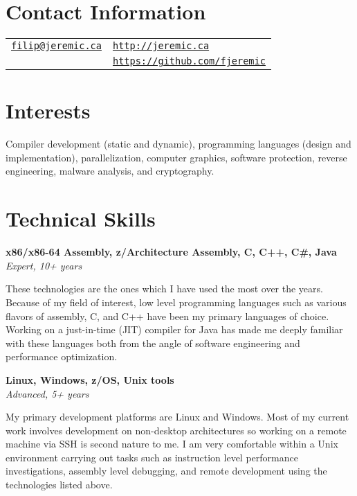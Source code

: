 \documentclass[margin,line]{res}
\begin{document}

\begin{resume}
\section{\sc Contact Information}

\vspace{.05in}

\begin{tabular}{@{}p{3.36in}p{3in}}
\href{mailto:filip@jeremic.ca}{\texttt{filip@jeremic.ca}} & \href{http://jeremic.ca}{\texttt{http://jeremic.ca}} \\
& \href{https://github.com/fjeremic}{\texttt{https://github.com/fjeremic}}
\end{tabular}

\section{\sc Interests}

Compiler development (static and dynamic), programming languages (design and implementation), parallelization, computer
graphics, software protection, reverse engineering, malware analysis, and cryptography.

\section{\sc Technical \newline Skills}

{\bf x86/x86-64 Assembly, z/Architecture Assembly, C, C++, C\#, Java} \\
{\em Expert, 10+ years}

These technologies are the ones which I have used the most over the years. Because of my field of interest, low level
programming languages such as various flavors of assembly, C, and C++ have been my primary languages of choice.
Working on a just-in-time (JIT) compiler for Java has made me deeply familiar with these languages both
from the angle of software engineering and performance optimization.

{\bf Linux, Windows, z/OS, Unix tools } \\
{\em Advanced, 5+ years}

My primary development platforms are Linux and Windows. Most of my current work involves development on non-desktop
architectures so working on a remote machine via SSH is second nature to me. I am very comfortable within a Unix
environment carrying out tasks such as instruction level performance investigations, assembly level debugging, and
remote development using the technologies listed above.


\end{resume}
\end{document}
